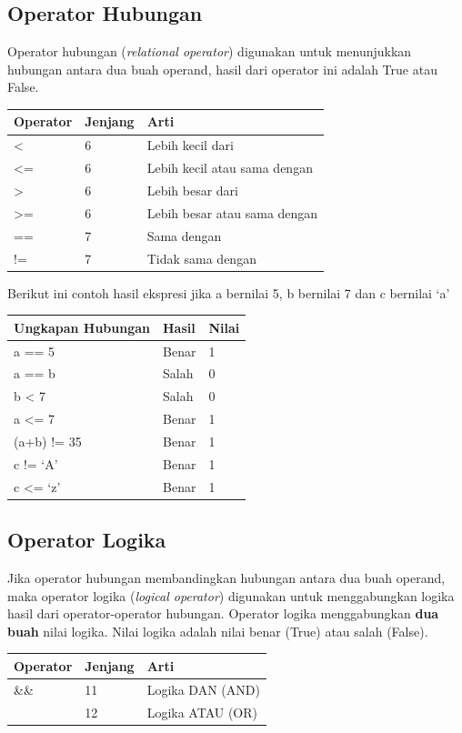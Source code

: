\subsection{Operator Hubungan}\label{e-operator-hubungan}

Operator hubungan (\emph{relational operator}) digunakan untuk
menunjukkan hubungan antara dua buah operand, hasil dari operator ini
adalah True atau False.

\begin{longtable}[]{@{}lll@{}}
\toprule
Operator & Jenjang & Arti\tabularnewline
\midrule
\endhead
\textless{} & 6 & Lebih kecil dari\tabularnewline
\textless{}= & 6 & Lebih kecil atau sama dengan\tabularnewline
\textgreater{} & 6 & Lebih besar dari\tabularnewline
\textgreater{}= & 6 & Lebih besar atau sama dengan\tabularnewline
== & 7 & Sama dengan\tabularnewline
!= & 7 & Tidak sama dengan\tabularnewline
\bottomrule
\end{longtable}

Berikut ini contoh hasil ekspresi jika a bernilai 5, b bernilai 7 dan c
bernilai `a'

\begin{longtable}[]{@{}lll@{}}
\toprule
Ungkapan Hubungan & Hasil & Nilai\tabularnewline
\midrule
\endhead
a == 5 & Benar & 1\tabularnewline
a == b & Salah & 0\tabularnewline
b \textless{} 7 & Salah & 0\tabularnewline
a \textless{}= 7 & Benar & 1\tabularnewline
(a+b) != 35 & Benar & 1\tabularnewline
c != `A' & Benar & 1\tabularnewline
c \textless{}= `z' & Benar & 1\tabularnewline
\bottomrule
\end{longtable}

\subsection{Operator Logika}\label{f-operator-logika}

Jika operator hubungan membandingkan hubungan antara dua buah operand,
maka operator logika (\emph{logical operator}) digunakan untuk
menggabungkan logika hasil dari operator-operator hubungan. Operator
logika menggabungkan \textbf{dua buah} nilai logika. Nilai logika adalah
nilai benar (True) atau salah (False).

\begin{longtable}[]{@{}lll@{}}
\toprule
Operator & Jenjang & Arti\tabularnewline
\midrule
\endhead
\&\& & 11 & Logika DAN (AND)\tabularnewline
\texttt{\textbar{}\textbar{}} & 12 & Logika ATAU (OR)\tabularnewline
\bottomrule
\end{longtable}


